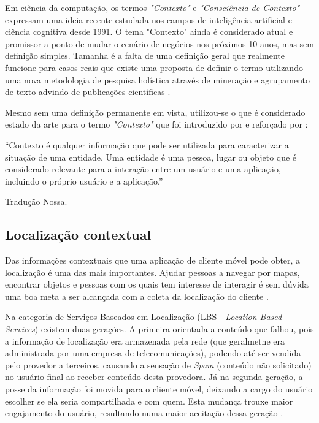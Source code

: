Em ciência da computação, os termos \emph{"Contexto"} e \emph{"Consciência
de Contexto"} expressam uma ideia recente estudada nos campos de inteligência
artificial e ciência cognitiva desde 1991. O tema "Contexto" ainda é considerado
atual e promissor a ponto de mudar o cenário de negócios nos próximos 10 anos, mas
sem definição simples. Tamanha é a falta de uma definição geral que
realmente funcione para casos reais que existe uma proposta de definir o termo
utilizando uma nova metodologia de pesquisa holística através de mineração e
agrupamento de texto advindo de publicações científicas \cite{Pascalau2013}.

Mesmo sem uma definição permanente em vista, utilizou-se o que é considerado
estado da arte para o termo \emph{"Contexto"} que foi introduzido por
 e reforçado por :

\begin{citacao}

	``Contexto é qualquer informação que pode ser utilizada para caracterizar a
	situação de uma entidade. Uma entidade é uma pessoa, lugar ou objeto que é
	considerado relevante para a interação entre um usuário e uma aplicação,
	incluindo o próprio usuário e a aplicação.'' \

	 Tradução Nossa.
\end{citacao}

\subsection{Localização contextual}
\label{subsec:Localização contextual}

Das informações contextuais que uma aplicação de cliente móvel pode obter, a
localização é uma das mais importantes. Ajudar pessoas a navegar por mapas,
encontrar objetos e pessoas com os quais tem interesse de interagir é sem dúvida
uma boa meta a ser alcançada com a coleta da localização do cliente
\cite{Bellavista2008}.

Na categoria de Serviços Baseados em Localização (LBS - \emph{Location-Based
Services}) existem duas gerações. A primeira orientada a conteúdo que falhou,
pois a informação de localização era armazenada pela rede (que geralmetne era
administrada por uma empresa de telecomunicações), podendo até ser vendida pelo
provedor a terceiros, causando a sensação de \emph{Spam} (conteúdo não
solicitado) no usuário final ao receber conteúdo desta provedora. Já na segunda
geração, a posse da informação foi movida para o cliente móvel, deixando a cargo
do usuário escolher se ela seria compartilhada e com quem. Esta mudança trouxe
maior engajamento do usuário, resultando numa maior aceitação dessa geração
\cite{Bellavista2008}.


